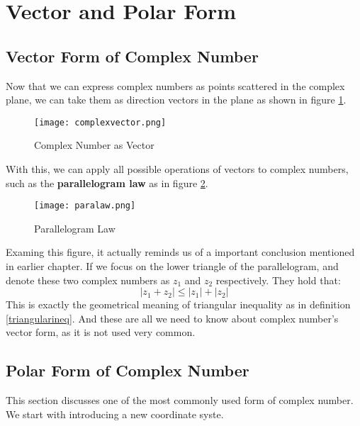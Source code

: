 \section{Vector and Polar Form}
\subsection{Vector Form of Complex Number}
Now that we can express complex numbers as points scattered in the complex plane, we can take them as direction vectors
in the plane as shown in figure \ref{vec}. 
\begin{figure}[H]
    \centering \label{vec}
    \texttt{[image: complexvector.png]}
    \caption{Complex Number as Vector}
\end{figure}
With this, we can apply all possible operations of vectors to complex numbers, such as the \textbf{parallelogram law} as in figure \ref{parrl}.
\begin{figure}[H]
    \centering \label{parrl}
    \texttt{[image: paralaw.png]}
    \caption{Parallelogram Law}
\end{figure}
Examing this figure, it actually reminds us of a important conclusion mentioned in earlier chapter. If we focus on
the lower triangle of the parallelogram, and denote these two complex numbers as $z_1$ and $z_2$ respectively.
They hold that: $$|z_1+z_2| \leq |z_1|+|z_2|$$
This is exactly the geometrical meaning of triangular inequality as in definition \ref{triangularineq}.
And these are all we need to know about complex number's vector form, as it is not used very common.

\subsection{Polar Form of Complex Number}
This section discusses one of the most commonly used form of complex number. We start with introducing a new coordinate syste.

